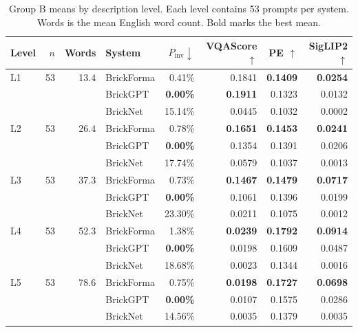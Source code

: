 \begin{table}[t]
\centering\small
\setlength{\tabcolsep}{3pt}
\begin{tabular}{lrrlrrrr}
\toprule
Level & $n$ & Words & System & $P_{\mathrm{inv}}\downarrow$ & VQAScore $\uparrow$ & PE $\uparrow$ & SigLIP2 $\uparrow$ \\
\midrule
L1 & 53 & 13.4 & BrickForma & 0.41\% & 0.1841 & \textbf{0.1409} & \textbf{0.0254} \\
 &  &  & BrickGPT & \textbf{0.00\%} & \textbf{0.1911} & 0.1323 & 0.0132 \\
 &  &  & BrickNet & 15.14\% & 0.0445 & 0.1032 & 0.0002 \\
\midrule
L2 & 53 & 26.4 & BrickForma & 0.78\% & \textbf{0.1651} & \textbf{0.1453} & \textbf{0.0241} \\
 &  &  & BrickGPT & \textbf{0.00\%} & 0.1354 & 0.1391 & 0.0206 \\
 &  &  & BrickNet & 17.74\% & 0.0579 & 0.1037 & 0.0013 \\
\midrule
L3 & 53 & 37.3 & BrickForma & 0.73\% & \textbf{0.1467} & \textbf{0.1479} & \textbf{0.0717} \\
 &  &  & BrickGPT & \textbf{0.00\%} & 0.1061 & 0.1396 & 0.0199 \\
 &  &  & BrickNet & 23.30\% & 0.0211 & 0.1075 & 0.0012 \\
\midrule
L4 & 53 & 52.3 & BrickForma & 1.38\% & \textbf{0.0239} & \textbf{0.1792} & \textbf{0.0914} \\
 &  &  & BrickGPT & \textbf{0.00\%} & 0.0198 & 0.1609 & 0.0487 \\
 &  &  & BrickNet & 18.68\% & 0.0023 & 0.1344 & 0.0016 \\
\midrule
L5 & 53 & 78.6 & BrickForma & 0.75\% & \textbf{0.0198} & \textbf{0.1727} & \textbf{0.0698} \\
 &  &  & BrickGPT & \textbf{0.00\%} & 0.0107 & 0.1575 & 0.0286 \\
 &  &  & BrickNet & 14.56\% & 0.0035 & 0.1379 & 0.0035 \\
\bottomrule
\end{tabular}
\caption{Group B means by description level. Each level contains 53 prompts per system. Words is the mean English word count. Bold marks the best mean.}
\label{tab:level-results}
\end{table}
